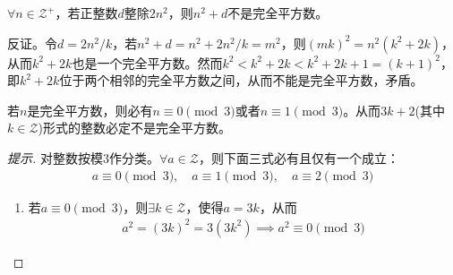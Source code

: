\begin{example}[1953 \kurschak]
  $\forall n\in\mathcal{Z}^+$，若正整数$d$整除$2n^2$，则$n^2+d$不是完全平方数。
\end{example}

\hints 反证。令$d=2n^2/k$，若$n^2+d=n^2+2n^2/k=m^2$，则$(mk)^2=n^2(k^2+2k)$，从而$k^2+2k$也是一个完全平方数。然而$k^2<k^2+2k<k^2+2k+1=(k+1)^2$，即$k^2+2k$位于两个相邻的完全平方数之间，从而不能是完全平方数，矛盾。

\begin{example}\label{ex:3k+2-not-square}
  若$n$是完全平方数，则必有$n\equiv 0\pmod3$或者$n\equiv 1\pmod3$。从而$3k+2$(其中$k\in\mathcal{Z}$)形式的整数必定不是完全平方数。

\end{example}
\begin{proof}[提示]



  对整数按模3作分类。$\forall a\in \mathcal{Z}$，则下面三式必有且仅有一个成立：
  \begin{align*}
    a\equiv0\pmod3,\quad a\equiv1\pmod3,\quad a\equiv2\pmod3
  \end{align*}

  \begin{enumerate}
  \item 若$a\equiv0\pmod3$，则$\exists k\in\mathcal{Z}$，使得$a=3k$，从而
    \begin{align*}
      a^2=(3k)^2=3(3k^2) \implies a^2\equiv 0\pmod3
    \end{align*}
    

\end{enumerate}
\end{proof}
